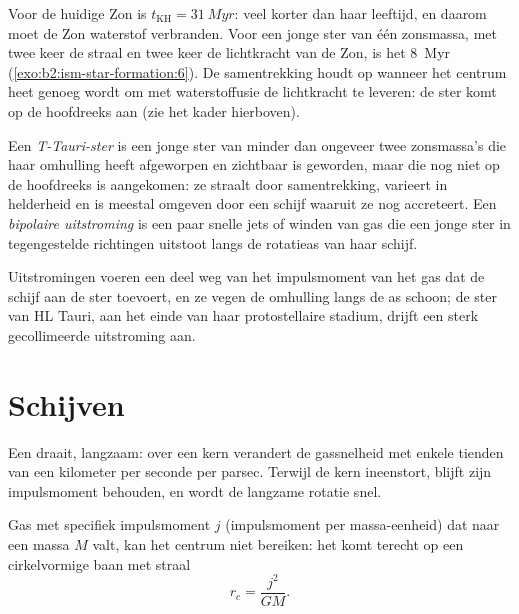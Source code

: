 Voor de huidige Zon is $t_{\mathrm{KH}} = \qty{31}{Myr}$: veel korter dan haar
leeftijd, en daarom moet de Zon waterstof verbranden. Voor een jonge ster van één zonsmassa,
met twee keer de straal en twee keer de lichtkracht van de Zon, is het \qty{8}{Myr}
(\cref{exo:b2:ism-star-formation:6}). De samentrekking houdt op wanneer het centrum heet genoeg wordt om met waterstoffusie
de lichtkracht te leveren: de ster komt op de hoofdreeks aan (zie het kader hierboven).

\begin{definition}\label{def:b2:ism-star-formation:t-tauri}
Een \emph{T-Tauri-ster} is een jonge ster van minder dan ongeveer
twee zonsmassa's die haar omhulling heeft afgeworpen en zichtbaar is geworden, maar die nog
niet op de hoofdreeks is aangekomen: ze straalt door samentrekking, varieert in
helderheid en is meestal omgeven door een schijf waaruit ze nog
accreteert. Een \emph{bipolaire uitstroming} is een paar snelle
jets of winden van gas die een jonge ster in tegengestelde richtingen uitstoot langs de
rotatieas van haar schijf.
\end{definition}

Uitstromingen voeren een deel weg van het impulsmoment van het gas dat de schijf
aan de ster toevoert, en ze vegen de omhulling langs de as schoon; de ster van
HL Tauri, aan het einde van haar protostellaire stadium, drijft een sterk gecollimeerde
uitstroming aan.

\section{Schijven}

Een  draait, langzaam: over een kern verandert de gassnelheid met enkele
tienden van een kilometer per seconde per parsec. Terwijl de kern ineenstort, blijft zijn
impulsmoment behouden, en wordt de langzame rotatie snel.

\begin{proposition}\label{prop:b2:ism-star-formation:centrifugal}
Gas met specifiek impulsmoment $j$ (impulsmoment per massa-eenheid)
dat naar een massa $M$ valt, kan het centrum niet bereiken: het komt terecht op een cirkelvormige
baan met straal
\[
  r_c = \frac{j^2}{G M}.
\]
\end{proposition}

